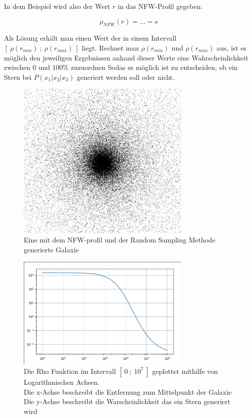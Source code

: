 In dem Beispiel wird also der Wert \( r \) in das NFW-Profil gegeben:

\begin{equation*}
  \rho_{NFW}(r) = \dots = s
\end{equation*}

Als Lösung erhält man einen Wert der in einem Intervall
\( [~\rho(r_{min})~;~\rho(r_{max})~] \) liegt. Rechnet man \( \rho(r_{min}) \) und
\( \rho(r_{max}) \) aus, ist es möglich den jeweiligen Ergebnissen anhand dieser
Werte eine Wahrscheinlichkeit zwischen \( 0 \) und \( 100\% \) zuzuordnen Sodas
es möglich ist zu entscheiden, ob ein Stern bei \( P(x_1 | x_2 | x_3) \) generiert
werden soll oder nicht.

\begin{figure}
  \centering
  \includegraphics[width=0.75\textwidth]{figs/galaxy}
  \caption{Eine mit dem NFW-profil und der Random Sampling Methode generierte Galaxie}
  \label{fig:galaxy}
\end{figure}

\begin{figure}
  \centering
  \includegraphics[width=0.75\textwidth]{figs/lookup_table_rho_r_function_grid}
  \caption{
  Die Rho Funktion im Intervall \( [~0~;~10^7 ~] \) geplottet mithilfe von Logarithmischen Achsen. \\
  Die x-Achse beschreibt die Entfernung zum Mittelpunkt der Galaxie \\
  Die y-Achse beschreibt die Warscheinlichkeit das ein Stern generiert wird
  }
  \label{fig:rho}
\end{figure}

